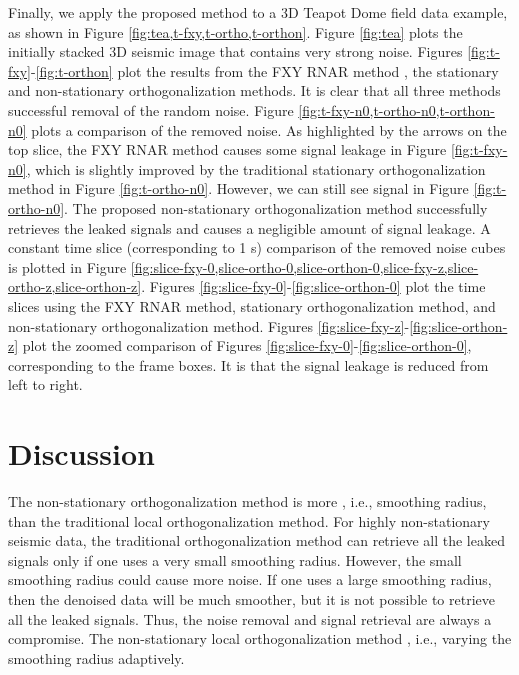 Finally, we apply the proposed method to a 3D Teapot Dome field data example, as shown in Figure \ref{fig:tea,t-fxy,t-ortho,t-orthon}. Figure \ref{fig:tea} plots the 
initially stacked 3D seismic image that contains very strong noise. Figures \ref{fig:t-fxy}-\ref{fig:t-orthon} plot the results from the FXY RNAR method \cite[]{guochang2013,wanghang2021geo}, the stationary and non-stationary orthogonalization methods. It is clear that all three methods  successful removal of the random noise. Figure \ref{fig:t-fxy-n0,t-ortho-n0,t-orthon-n0} plots a comparison of the removed noise. As highlighted by the arrows on the top slice, the FXY RNAR method causes some signal leakage in Figure \ref{fig:t-fxy-n0}, which is slightly improved by the traditional stationary orthogonalization method in Figure \ref{fig:t-ortho-n0}. However, we can still see signal in Figure \ref{fig:t-ortho-n0}.  The proposed non-stationary orthogonalization method successfully retrieves the leaked signals and causes a negligible amount of signal leakage.  A constant time slice (corresponding to 1 s) comparison of the removed noise cubes is plotted in Figure \ref{fig:slice-fxy-0,slice-ortho-0,slice-orthon-0,slice-fxy-z,slice-ortho-z,slice-orthon-z}. Figures \ref{fig:slice-fxy-0}-\ref{fig:slice-orthon-0} plot the time slices using the FXY RNAR method, stationary orthogonalization method, and non-stationary orthogonalization method. Figures \ref{fig:slice-fxy-z}-\ref{fig:slice-orthon-z} plot the zoomed comparison of Figures \ref{fig:slice-fxy-0}-\ref{fig:slice-orthon-0}, corresponding to the frame boxes. It is  that the signal leakage is reduced from left to right.




\section{Discussion}
The non-stationary orthogonalization method is more , i.e.,  smoothing radius, than the traditional local orthogonalization method. For highly non-stationary seismic data, the traditional orthogonalization method can retrieve all the leaked signals only if one uses a very small smoothing radius. However, the  small smoothing radius could cause more  noise. If one uses a  large smoothing radius, then the denoised data will be much smoother, but it is not possible to retrieve all the leaked signals. Thus, the noise removal and signal retrieval are always a compromise.  The non-stationary local orthogonalization method , i.e., varying the smoothing radius adaptively. 

